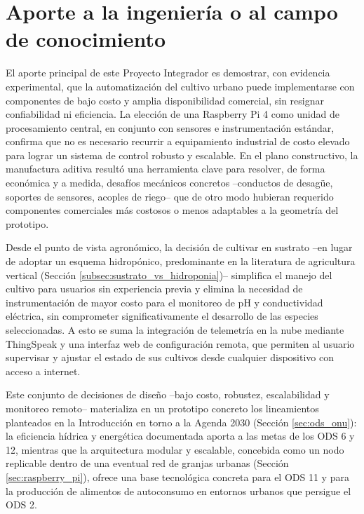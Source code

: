 \section*{Aporte a la ingeniería o al campo de conocimiento}

El aporte principal de este Proyecto Integrador es demostrar, con evidencia experimental, que la automatización del cultivo urbano puede implementarse con componentes de bajo costo y amplia disponibilidad comercial, sin resignar confiabilidad ni eficiencia. La elección de una Raspberry Pi 4 como unidad de procesamiento central, en conjunto con sensores e instrumentación estándar, confirma que no es necesario recurrir a equipamiento industrial de costo elevado para lograr un sistema de control robusto y escalable. En el plano constructivo, la manufactura aditiva resultó una herramienta clave para resolver, de forma económica y a medida, desafíos mecánicos concretos --conductos de desagüe, soportes de sensores, acoples de riego-- que de otro modo hubieran requerido componentes comerciales más costosos o menos adaptables a la geometría del prototipo.

Desde el punto de vista agronómico, la decisión de cultivar en sustrato --en lugar de adoptar un esquema hidropónico, predominante en la literatura de agricultura vertical (Sección \ref{subsec:sustrato_vs_hidroponia})-- simplifica el manejo del cultivo para usuarios sin experiencia previa y elimina la necesidad de instrumentación de mayor costo para el monitoreo de pH y conductividad eléctrica, sin comprometer significativamente el desarrollo de las especies seleccionadas. A esto se suma la integración de telemetría en la nube mediante ThingSpeak y una interfaz web de configuración remota, que permiten al usuario supervisar y ajustar el estado de sus cultivos desde cualquier dispositivo con acceso a internet.

Este conjunto de decisiones de diseño --bajo costo, robustez, escalabilidad y monitoreo remoto-- materializa en un prototipo concreto los lineamientos planteados en la Introducción en torno a la Agenda 2030 (Sección \ref{sec:ods_onu}): la eficiencia hídrica y energética documentada aporta a las metas de los ODS 6 y 12, mientras que la arquitectura modular y escalable, concebida como un nodo replicable dentro de una eventual red de granjas urbanas (Sección \ref{sec:raspberry_pi}), ofrece una base tecnológica concreta para el ODS 11 y para la producción de alimentos de autoconsumo en entornos urbanos que persigue el ODS 2.



